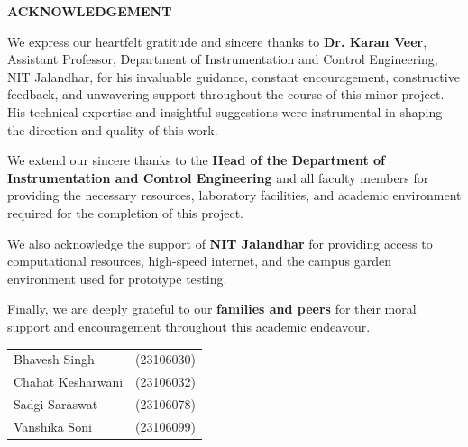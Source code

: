 \documentclass[12pt,a4paper,oneside]{report}
\begin{document}
\newpage
{}
{}
\begin{center}
{\Large \textbf{ACKNOWLEDGEMENT}}
\end{center}
\vspace{0.8cm}

\noindent We express our heartfelt gratitude and sincere thanks to \textbf{Dr. Karan Veer}, Assistant Professor, Department of Instrumentation and Control Engineering, NIT Jalandhar, for his invaluable guidance, constant encouragement, constructive feedback, and unwavering support throughout the course of this minor project. His technical expertise and insightful suggestions were instrumental in shaping the direction and quality of this work.

\noindent We extend our sincere thanks to the \textbf{Head of the Department of Instrumentation and Control Engineering} and all faculty members for providing the necessary resources, laboratory facilities, and academic environment required for the completion of this project.

\noindent We also acknowledge the support of \textbf{NIT Jalandhar} for providing access to computational resources, high-speed internet, and the campus garden environment used for prototype testing.

\noindent Finally, we are deeply grateful to our \textbf{families and peers} for their moral support and encouragement throughout this academic endeavour.

\vspace{2cm}
\noindent
\begin{tabular}{ll}
Bhavesh Singh      & (23106030) \\
Chahat Kesharwani  & (23106032) \\
Sadgi Saraswat     & (23106078) \\
Vanshika Soni      & (23106099) \\
\end{tabular}

\newpage
\pagestyle{fancy}
\tableofcontents

\newpage
{}
\setcounter{page}{1}
\end{document}
